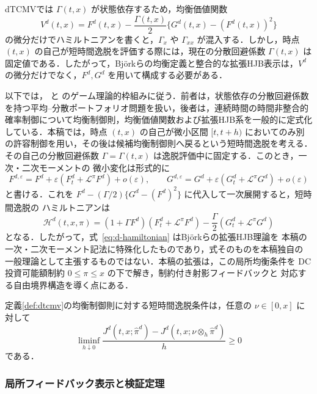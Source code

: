 \documentclass[10pt,a4paper]{article}
\theoremstyle{plain}
\theoremstyle{definition}
\newcommand{\Lop}{\mathcal{L}}
\newcommand{\Hamil}{\mathcal{H}}
\begin{document}
dTCMVでは $\Gamma(t,x)$ が状態依存するため，均衡価値関数
\[
  V^d(t,x)=F^d(t,x)-\frac{\Gamma(t,x)}{2}\{G^d(t,x)-(F^d(t,x))^2\}
\]
の微分だけでハミルトニアンを書くと，$\Gamma_x$ や $\Gamma_{xx}$ が混入する．しかし，時点 $(t,x)$ の自己が短時間逸脱を評価する際には，現在の分散回避係数 $\Gamma(t,x)$ は固定値である．したがって，Björkらの均衡定義と整合的な拡張HJB表示は，$V^d$ の微分だけでなく，$F^d,G^d$ を用いて構成する必要がある．

以下では，\citet{BjorkMurgociZhou2014} と\citet{BjorkKhapkoMurgoci2017} のゲーム理論的枠組みに従う．前者は，状態依存の分散回避係数を持つ平均--分散ポートフォリオ問題を扱い，後者は，連続時間の時間非整合的確率制御について均衡制御則，均衡価値関数および拡張HJB系を一般的に定式化している．本稿では，時点 $(t,x)$ の自己が微小区間 $[t,t+h)$ においてのみ別の許容制御を用い，その後は候補均衡制御則へ戻るという短時間逸脱を考える．その自己の分散回避係数
$\Gamma=\Gamma(t,x)$ は逸脱評価中に固定する．このとき，一次・二次モーメントの
微小変化は形式的に
\[
  F^{d,\varepsilon}
  =F^d+\varepsilon(F_t^d+\Lop^\pi F^d)+o(\varepsilon),
  \qquad
  G^{d,\varepsilon}
  =G^d+\varepsilon(G_t^d+\Lop^\pi G^d)+o(\varepsilon)
\]
と書ける．これを
$F^d-(\Gamma/2)\{G^d-(F^d)^2\}$ に代入して一次展開すると，短時間逸脱の
ハミルトニアンは
\begin{equation}
  \Hamil^d(t,x,\pi)
  =
  (1+\Gamma F^d)(F_t^d+\Lop^\pi F^d)
  -\frac{\Gamma}{2}(G_t^d+\Lop^\pi G^d)
  \label{eq:d-hamiltonian}
\end{equation}
となる．したがって，式~\eqref{eq:d-hamiltonian} はBjörkらの拡張HJB理論を
本稿の一次・二次モーメント記法に特殊化したものであり，式そのものを本稿独自の
一般理論として主張するものではない．本稿の拡張は，この局所均衡条件を
DC投資可能額制約 $0\leq\pi\leq x$ の下で解き，制約付き射影フィードバックと
対応する自由境界構造を導く点にある．

定義\ref{def:dtcmv}の均衡制御則に対する短時間逸脱条件は，任意の
$\nu\in[0,x]$ に対して
\begin{equation}
  \liminf_{h\downarrow0}
  \frac{J^d(t,x;\hat\pi^d)-J^d(t,x;\nu\otimes_h\hat\pi^d)}{h}
  \geq0
  \label{eq:d-equilibrium}
\end{equation}
である．

\subsubsection{局所フィードバック表示と検証定理}
\end{document}
